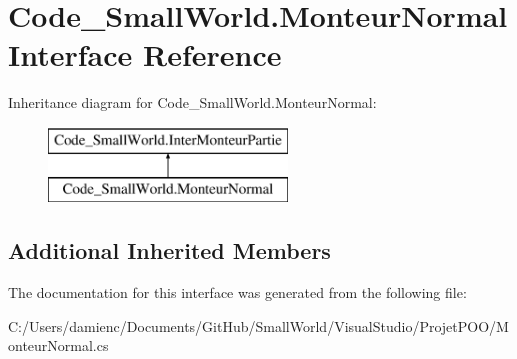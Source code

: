 \hypertarget{interface_code___small_world_1_1_monteur_normal}{\section{Code\-\_\-\-Small\-World.\-Monteur\-Normal Interface Reference}
\label{interface_code___small_world_1_1_monteur_normal}
}
Inheritance diagram for Code\-\_\-\-Small\-World.\-Monteur\-Normal\-:\begin{figure}[H]
\begin{center}
\leavevmode
\includegraphics[height=2.000000cm]{interface_code___small_world_1_1_monteur_normal}
\end{center}
\end{figure}
\subsection*{Additional Inherited Members}


The documentation for this interface was generated from the following file\-:\begin{DoxyCompactItemize}
\item 
C\-:/\-Users/damienc/\-Documents/\-Git\-Hub/\-Small\-World/\-Visual\-Studio/\-Projet\-P\-O\-O/Monteur\-Normal.\-cs\end{DoxyCompactItemize}
